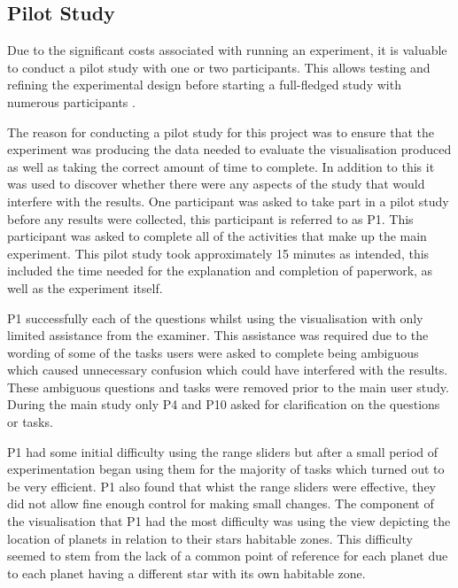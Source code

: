 \subsection{Pilot Study}
Due to the significant costs associated with running an experiment, it 
is valuable to conduct a pilot study with one or two 
participants. This allows testing and refining the experimental
design before starting a full-fledged study with numerous 
participants \cite{kosara2003thoughts}. 

The reason for conducting a pilot study for this project was to ensure that
the experiment was
producing the data needed to evaluate the visualisation produced as well
as taking the correct amount of time to complete. In addition to this it was
used to discover whether there were any aspects of the study that would
interfere with the results. One participant was asked to take part in a pilot
study before any results were
collected, this participant is referred to as P1. This participant was asked to
complete all of the activities that
make up the main experiment. This pilot study took approximately 15 minutes as
intended, this included the time needed for the explanation and completion of
paperwork, as well as the experiment itself.

P1 successfully each of the questions whilst using the visualisation with only
limited assistance from the examiner. This assistance was required due to the
wording of
some of the tasks users were asked to complete being ambiguous which caused
unnecessary confusion which could have interfered with the results. These
ambiguous questions and
tasks were removed prior to the main user study. During the main study only P4
and P10 asked for clarification on the questions or tasks.

P1 had some initial difficulty using the range sliders but after a small period
of experimentation began using them for the majority of tasks which turned out
to be very efficient. P1 also found that whist the range sliders were effective,
they did not allow fine enough control for making small changes. The component
of the visualisation that P1 had the most difficulty was using the
view depicting the location of planets in relation to their stars habitable
zones. This difficulty seemed to stem from the lack of a common point of
reference for each planet due to each planet having a different star with its
own habitable zone.

